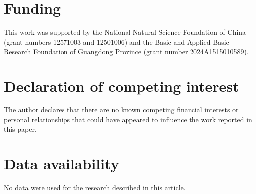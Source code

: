 \documentclass[10pt,fleqn]{article}
\numberwithin{equation}{section}
\begin{document}
\section*{Funding}

This work was supported by the National Natural Science Foundation of China (grant numbers
12571003 and 12501006) and the Basic and Applied Basic Research Foundation of Guangdong
Province (grant number 2024A1515010589).

\section*{Declaration of competing interest}

The author declares that there are no known competing financial interests or personal
relationships that could have appeared to influence the work reported in this paper.

\section*{Data availability}

No data were used for the research described in this article.
\end{document}
